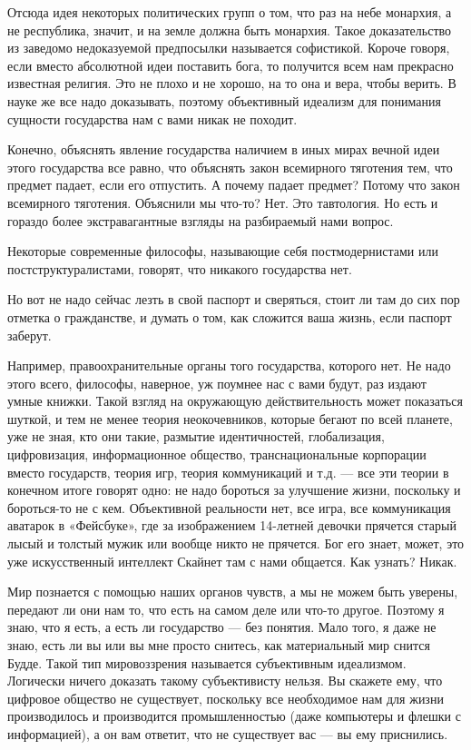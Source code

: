 Отсюда идея некоторых политических групп о том, что раз на небе монархия, а не
республика, значит, и на земле должна быть монархия. Такое доказательство из
заведомо недоказуемой предпосылки называется софистикой. Короче говоря, если
вместо абсолютной идеи поставить бога, то получится всем нам прекрасно
известная религия. Это не плохо и не хорошо, на то она и вера, чтобы верить. В
науке же все надо доказывать, поэтому объективный идеализм для понимания
сущности государства нам с вами никак не походит.

Конечно, объяснять явление государства наличием в иных мирах вечной идеи этого
государства все равно, что объяснять закон всемирного тяготения тем, что
предмет падает, если его отпустить. А почему падает предмет? Потому что закон
всемирного тяготения. Объяснили мы что-то? Нет. Это тавтология. Но есть и
гораздо более экстравагантные взгляды на разбираемый нами вопрос.

Некоторые современные философы, называющие себя постмодернистами или
постструктуралистами, говорят, что никакого государства нет.

Но вот не надо сейчас лезть в свой паспорт и сверяться, стоит ли там до сих пор
отметка о гражданстве, и думать о том, как сложится ваша жизнь, если паспорт
заберут.

Например, правоохранительные органы того государства, которого нет. Не надо
этого всего, философы, наверное, уж поумнее нас с вами будут, раз издают умные
книжки. Такой взгляд на окружающую действительность может показаться шуткой, и
тем не менее теория неокочевников, которые бегают по всей планете, уже не зная,
кто они такие, размытие идентичностей, глобализация, цифровизация,
информационное общество, транснациональные корпорации вместо государств, теория
игр, теория коммуникаций и т.д. — все эти теории в конечном итоге говорят одно:
не надо бороться за улучшение жизни, поскольку и бороться-то не с кем.
Объективной реальности нет, все игра, все коммуникация аватарок в «Фейсбуке»,
где за изображением 14-летней девочки прячется старый лысый и толстый мужик или
вообще никто не прячется. Бог его знает, может, это уже искусственный интеллект
Скайнет там с нами общается. Как узнать? Никак.

Мир познается с помощью наших органов чувств, а мы не можем быть уверены,
передают ли они нам то, что есть на самом деле или что-то другое. Поэтому я
знаю, что я есть, а есть ли государство — без понятия. Мало того, я даже не
знаю, есть ли вы или вы мне просто снитесь, как материальный мир снится Будде.
Такой тип мировоззрения называется субъективным идеализмом. Логически ничего
доказать такому субъективисту нельзя. Вы скажете ему, что цифровое общество не
существует, поскольку все необходимое нам для жизни производилось и
производится промышленностью (даже компьютеры и флешки с информацией), а он вам
ответит, что не существует вас — вы ему приснились.

